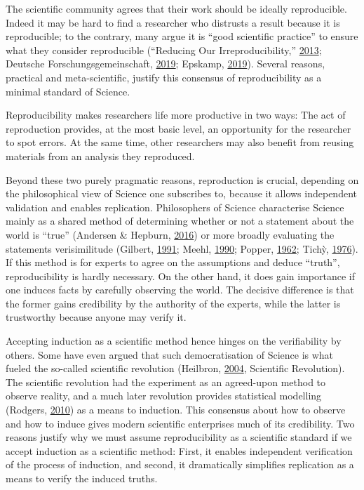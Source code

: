 \documentclass[12pt,a4paper,]{article}
\begin{document}
The scientific community agrees that their work should be ideally reproducible.
Indeed it may be hard to find a researcher who distrusts a result because it is reproducible; to the contrary, many argue it is ``good scientific practice'' to ensure what they consider reproducible (``Reducing Our Irreproducibility,'' \protect\hyperlink{ref-AnnouncementReducingOur2013}{2013}; Deutsche Forschungsgemeinschaft, \protect\hyperlink{ref-dfg2019}{2019}; Epskamp, \protect\hyperlink{ref-epskamp2019rep}{2019}).
Several reasons, practical and meta-scientific, justify this consensus of reproducibility as a minimal standard of Science.

Reproducibility makes researchers life more productive in two ways:
The act of reproduction provides, at the most basic level, an opportunity for the researcher to spot errors. At the same time, other researchers may also benefit from reusing materials from an analysis they reproduced.

Beyond these two purely pragmatic reasons, reproduction is crucial, depending on the philosophical view of Science one subscribes to, because it allows independent validation and enables replication.
Philosophers of Science characterise Science mainly as a shared method of determining whether or not a statement about the world is ``true'' (Andersen \& Hepburn, \protect\hyperlink{ref-andersonScientificMethod2016}{2016}) or more broadly evaluating the statements verisimilitude (Gilbert, \protect\hyperlink{ref-gilbertModelBuildingDefinition1991}{1991}; Meehl, \protect\hyperlink{ref-meehlAppraisingAmendingTheories1990}{1990}; Popper, \protect\hyperlink{ref-popperCommentsTruthGrowth1962}{1962}; Tichỳ, \protect\hyperlink{ref-tichyVerisimilitudeRedefined1976}{1976}).
If this method is for experts to agree on the assumptions and deduce ``truth'', reproducibility is hardly necessary.
On the other hand, it does gain importance if one induces facts by carefully observing the world.
The decisive difference is that the former gains credibility by the authority of the experts, while the latter is trustworthy because anyone may verify it.

Accepting induction as a scientific method hence hinges on the verifiability by others.
Some have even argued that such democratisation of Science is what fueled the so-called scientific revolution (Heilbron, \protect\hyperlink{ref-heilbronOxfordCompanionHistory2004}{2004}, Scientific Revolution).
The scientific revolution had the experiment as an agreed-upon method to observe reality, and a much later revolution provides statistical modelling (Rodgers, \protect\hyperlink{ref-rodgersEpistemologyMathematicalStatistical2010}{2010}) as a means to induction.
This consensus about how to observe and how to induce gives modern scientific enterprises much of its credibility.
Two reasons justify why we must assume reproducibility as a scientific standard if we accept induction as a scientific method:
First, it enables independent verification of the process of induction, and second, it dramatically simplifies replication as a means to verify the induced truths.
\end{document}
